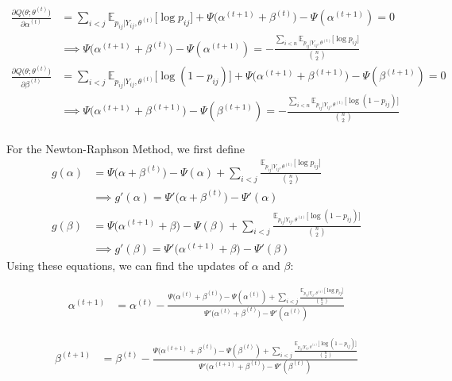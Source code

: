 \documentclass{article}
\begin{document}
\begin{align*}
\frac{\partial Q\big(\theta; \theta^{(t)}\big)}{\partial \alpha^{(t)}} &= \sum_{i<j} \mathbb{E}_{p_{ij} | Y_{ij}, \theta^{(t)}} \big[\log p_{ij}\big] + \Psi\Big(\alpha^{(t+1)} + \beta^{(t)}\Big) - \Psi(\alpha^{(t+1)})= 0 \\
&\implies \Psi\Big(\alpha^{(t+1)} + \beta^{(t)}\Big) - \Psi(\alpha^{(t+1)}) = -\frac{\sum_{i<n}\mathbb{E}_{p_{ij} | Y_{ij}, \theta^{(t)}} \big[\log p_{ij}\big]}{{n \choose 2}} \tag{M1} \\
\frac{\partial Q\big(\theta; \theta^{(t)}\big)}{\partial \beta^{(t)}} &= \sum_{i<j} \mathbb{E}_{p_{ij} | Y_{ij}, \theta^{(t)}} \big[\log (1- p_{ij})\big] + \Psi\Big(\alpha^{(t+1)} + \beta^{(t+1)}\Big) - \Psi(\beta^{(t+1)}) = 0 \\
&\implies \Psi\Big(\alpha^{(t+1)} + \beta^{(t+1)}\Big) - \Psi(\beta^{(t+1)}) = -\frac{\sum_{i<n}\mathbb{E}_{p_{ij} | Y_{ij}, \theta^{(t)}} \big[\log (1 - p_{ij})\big]}{{n \choose 2}} \tag{M2} \\
\end{align*}

For the Newton-Raphson Method, we first define 
\begin{align*}
g(\alpha) &= \Psi \big(\alpha + \beta^{(t)} \big) - \Psi(\alpha) + \sum_{i < j}\frac{ \mathbb{E}_{p_{ij} | Y_{ij}, \theta^{(t)}} \big[\log p_{ij}\big] }{{n \choose 2}} \\
&\implies g'(\alpha) = \Psi' \big(\alpha + \beta^{(t)} \big) - \Psi'(\alpha) \\
g(\beta) &= \Psi \big(\alpha^{(t+1)} + \beta \big) - \Psi(\beta) + \sum_{i < j}\frac{ \mathbb{E}_{p_{ij} | Y_{ij}, \theta^{(t)}} \big[\log (1- p_{ij})\big] }{{n \choose 2}} \\
&\implies g'(\beta) = \Psi' \big(\alpha^{(t+1)}  + \beta\big) - \Psi'(\beta)
\end{align*}
Using these equations, we can find the updates of $\alpha$ and $\beta$:

\begin{align*}
\alpha^{(t+1)} &= \alpha^{(t)} - \frac{\Psi\big(\alpha^{(t)} + \beta^{(t)}\big) - \Psi(\alpha^{(t)}) + \sum_{i < j}\frac{ \mathbb{E}_{p_{ij} | Y_{ij}, \theta^{(t)}} \big[\log p_{ij}\big] }{{n \choose 2}}}{\Psi'\big(\alpha^{(t)} + \beta^{(t)}\big) - \Psi'(\alpha^{(t)})} \tag{$\alpha$}
\end{align*}

\begin{align*}
\beta^{(t+1)} &= \beta^{(t)} - \frac{\Psi\big(\alpha^{(t+1)} + \beta^{(t)}\big) - \Psi(\beta^{(t)}) + \sum_{i < j}\frac{ \mathbb{E}_{p_{ij} | Y_{ij}, \theta^{(t)}} \big[\log (1- p_{ij})\big] }{{n \choose 2}}}{\Psi'\big(\alpha^{(t+1)} + \beta^{(t)}\big) - \Psi'(\beta^{(t)})} \tag{$\beta$}
\end{align*}
\end{document}
